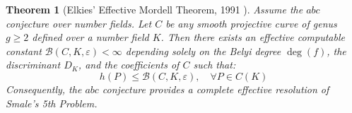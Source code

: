 \documentclass[11pt,a4paper]{article}
\newtheorem{theorem}{Theorem}[section]
\theoremstyle{definition}
\begin{document}
\begin{theorem}[Elkies' Effective Mordell Theorem, 1991 \cite{elkies1991}]\label{thm:elkies}
Assume the $abc$ conjecture over number fields. Let $C$ be any smooth projective curve of genus $g \ge 2$ defined over a number field $K$. Then there exists an effective computable constant $\mathcal{B}(C, K, \varepsilon) < \infty$ depending solely on the Belyi degree $\deg(f)$, the discriminant $D_K$, and the coefficients of $C$ such that:
\begin{equation}\label{eq:elkies_bound}
h(P) \le \mathcal{B}(C, K, \varepsilon), \quad \forall P \in C(K)
\end{equation}
Consequently, the $abc$ conjecture provides a complete effective resolution of Smale's 5th Problem.
\end{theorem}
\end{document}
